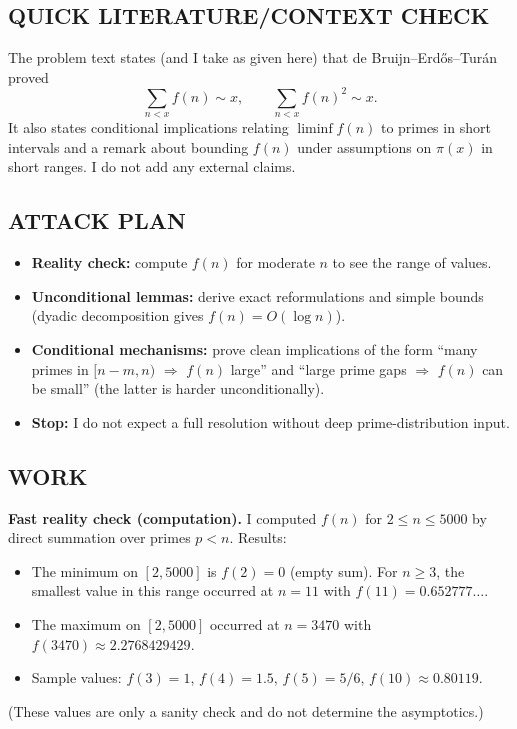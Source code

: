 \subsection*{QUICK LITERATURE/CONTEXT CHECK}
The problem text states (and I take as given here) that de Bruijn--Erd\H{o}s--Tur\'an proved
\[
\sum_{n<x} f(n)\sim x,\qquad \sum_{n<x} f(n)^2\sim x.
\]
It also states conditional implications relating $\liminf f(n)$ to primes in short intervals and a remark about bounding $f(n)$ under assumptions on $\pi(x)$ in short ranges.
I do not add any external claims.

\subsection*{ATTACK PLAN}
\begin{itemize}
\item \textbf{Reality check:} compute $f(n)$ for moderate $n$ to see the range of values.
\item \textbf{Unconditional lemmas:} derive exact reformulations and simple bounds (dyadic decomposition gives $f(n)=O(\log n)$).
\item \textbf{Conditional mechanisms:} prove clean implications of the form ``many primes in $[n-m,n)$ $\Rightarrow$ $f(n)$ large'' and ``large prime gaps $\Rightarrow$ $f(n)$ can be small'' (the latter is harder unconditionally).
\item \textbf{Stop:} I do not expect a full resolution without deep prime-distribution input.
\end{itemize}

\subsection*{WORK}
\noindent\textbf{Fast reality check (computation).}
I computed $f(n)$ for $2\le n\le 5000$ by direct summation over primes $p<n$.
Results:
\begin{itemize}
\item The minimum on $[2,5000]$ is $f(2)=0$ (empty sum). For $n\ge3$, the smallest value in this range occurred at $n=11$ with $f(11)=0.652777\ldots$.
\item The maximum on $[2,5000]$ occurred at $n=3470$ with $f(3470)\approx 2.2768429429$.
\item Sample values: $f(3)=1$, $f(4)=1.5$, $f(5)=5/6$, $f(10)\approx 0.80119$.
\end{itemize}
(These values are only a sanity check and do not determine the asymptotics.)

